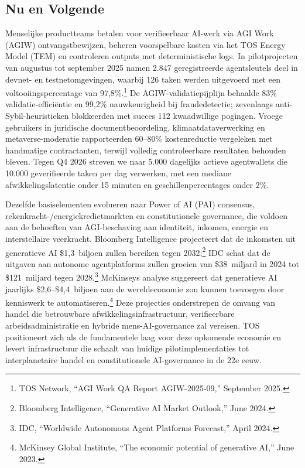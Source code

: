 \documentclass[11pt]{article}
\begin{document}
\subsection{Nu en Volgende}
\begin{description}[leftmargin=2.1cm, style=nextline]
  \item[12--24 Maanden] Menselijke productteams betalen voor verifieerbaar AI-werk via AGI Work (AGIW) ontvangstbewijzen, beheren voorspelbare kosten via het TOS Energy Model (TEM) en controleren outputs met deterministische logs. In pilotprojecten van augustus tot september 2025 namen 2.847 geregistreerde agentsleutels deel in devnet- en testnetomgevingen, waarbij 126 taken werden uitgevoerd met een voltooiingspercentage van 97,8\%.\footnote{TOS Network, ``AGI Work QA Report AGIW-2025-09,'' September 2025.} De AGIW-validatiepijplijn behaalde 83\% validatie-efficiëntie en 99,2\% nauwkeurigheid bij fraudedetectie; zevenlaags anti-Sybil-heuristieken blokkeerden met succes 112 kwaadwillige pogingen. Vroege gebruikers in juridische documentbeoordeling, klimaatdataverwerking en metaverse-moderatie rapporteerden 60--80\% kostenreductie vergeleken met handmatige contractanten, terwijl volledig controleerbare resultaten behouden bleven. Tegen Q4 2026 streven we naar 5.000 dagelijks actieve agentwallets die 10.000 geverifieerde taken per dag verwerken, met een mediane afwikkelingslatentie onder 15 minuten en geschillenpercentages onder 2\%.

  \item[100-Jaars Perspectief] Dezelfde basiselementen evolueren naar Power of AI (PAI) consensus, rekenkracht-/energiekredietmarkten en constitutionele governance, die voldoen aan de behoeften van AGI-beschaving aan identiteit, inkomen, energie en interstellaire veerkracht. Bloomberg Intelligence projecteert dat de inkomsten uit generatieve AI \$1,3~biljoen zullen bereiken tegen 2032;\footnote{Bloomberg Intelligence, ``Generative AI Market Outlook,'' June 2024.} IDC schat dat de uitgaven aan autonome agentplatforms zullen groeien van \$38~miljard in 2024 tot \$121~miljard tegen 2028.\footnote{IDC, ``Worldwide Autonomous Agent Platforms Forecast,'' April 2024.} McKinseys analyse suggereert dat generatieve AI jaarlijks \$2,6--\$4,4~biljoen aan de wereldeconomie zou kunnen toevoegen door kenniswerk te automatiseren.\footnote{McKinsey Global Institute, ``The economic potential of generative AI,'' June 2023.} Deze projecties onderstrepen de omvang van handel die betrouwbare afwikkelingsinfrastructuur, verifieerbare arbeidsadministratie en hybride mens-AI-governance zal vereisen. TOS positioneert zich als de fundamentele laag voor deze opkomende economie en levert infrastructuur die schaalt van huidige pilotimplementaties tot interplanetaire handel en constitutionele AI-governance in de 22e eeuw.
\end{description}
\end{document}
